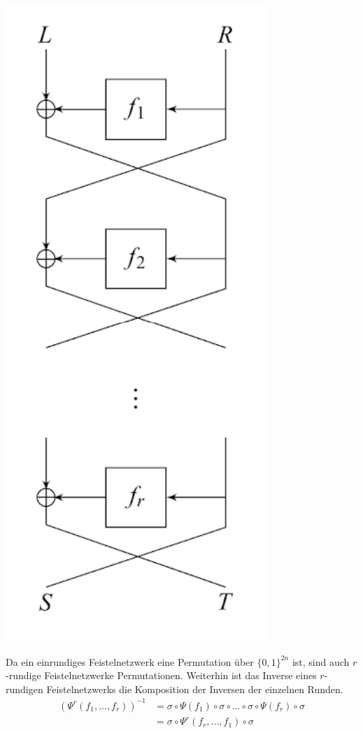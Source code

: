 \documentclass[course=erap]{aspdoc}
\begin{document}
\begin{center}
    \includegraphics[scale=1]{img/r_round_feistel_cipher_enc.png}\break
    \cite[Fig. 2.2]{nachef}
\end{center}

Da ein einrundiges Feistelnetzwerk eine Permutation über $\{0,1\}^{2n}$ ist, sind auch $r$-rundige Feistelnetzwerke Permutationen. Weiterhin ist das Inverse eines $r$-rundigen Feistelnetzwerks die Komposition der Inversen der einzelnen Runden.
\begin{align*}
    (\Psi^r(f_1, ..., f_r))^{-1} &= \sigma \circ \Psi(f_1) \circ \sigma \circ ... \circ \sigma \circ \Psi(f_r) \circ \sigma \\
                                 &= \sigma \circ \Psi^r(f_r, ..., f_1) \circ \sigma
\end{align*}\cite[p.13]{nachef}\bigbreak
\end{document}
